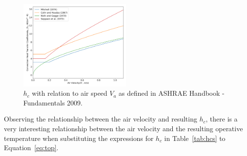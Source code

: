     \begin{figure}[h!]
            \centering
            \includegraphics[width=0.5\textwidth]{figures/hcs4.png}
            \caption{$h_c$ with relation to air speed $V_a$ as defined in ASHRAE Handbook - Fundamentals 2009.}
            \label{fig:hc4s}
    \end{figure}
    Observing the relationship between the air velocity and resulting $h_c$, there is a very interesting relationship between the air velocity and the resulting operative temperature when substituting the expressions for $h_c$ in Table~\ref{tab:hcs} to Equation~\ref{eq:top}.
